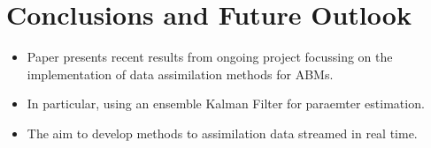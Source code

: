 \section{Conclusions and Future Outlook}
\label{malleson:conclusion}

\begin{itemize}
    \item Paper presents recent results from ongoing project focussing on the implementation of data assimilation methods for ABMs.
    \item In particular, using an ensemble Kalman Filter for paraemter estimation.
    \item The aim to develop methods to assimilation data streamed in real time.
\end{itemize}